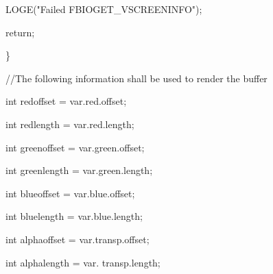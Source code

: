 \begin{DoxyPre}				LOGE("Failed FBIOGET\_VSCREENINFO");\end{DoxyPre}



\begin{DoxyPre}				return;\end{DoxyPre}



\begin{DoxyPre}			\}\end{DoxyPre}



\begin{DoxyPre}			//The following information shall be used to render the buffer\end{DoxyPre}



\begin{DoxyPre}			int redoffset = var.red.offset;\end{DoxyPre}



\begin{DoxyPre}			int redlength = var.red.length;\end{DoxyPre}



\begin{DoxyPre}			int greenoffset = var.green.offset;\end{DoxyPre}



\begin{DoxyPre}			int greenlength = var.green.length;\end{DoxyPre}



\begin{DoxyPre}			int blueoffset = var.blue.offset;\end{DoxyPre}



\begin{DoxyPre}			int bluelength = var.blue.length;\end{DoxyPre}



\begin{DoxyPre}			int alphaoffset = var.transp.offset;\end{DoxyPre}



\begin{DoxyPre}			int alphalength = var. transp.length;\end{DoxyPre}



